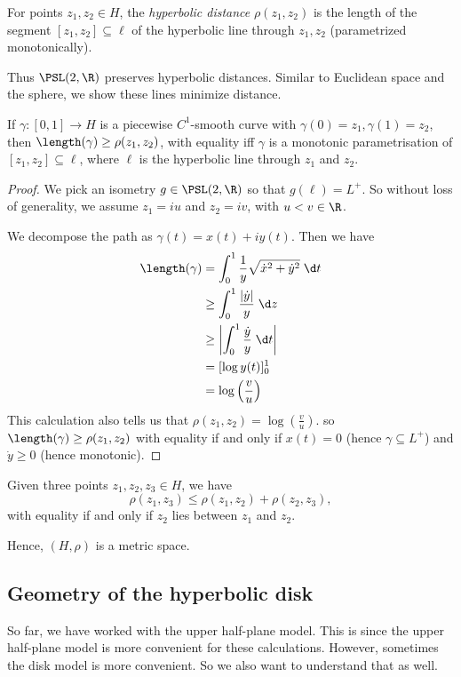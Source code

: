 \documentclass[a4paper]{article}
\begin{document}
\begin{defi}
  For points $z_1, z_2 \in H$, the \emph{hyperbolic distance} $\rho(z_1, z_2)$ is the length of the segment $[z_1, z_2] \subseteq \ell$ of the hyperbolic line through $z_1, z_2$ (parametrized monotonically).
\end{defi}
Thus $\PSL(2, \R)$ preserves hyperbolic distances. Similar to Euclidean space and the sphere, we show these lines minimize distance.

\begin{prop}
  If $\gamma: [0, 1] \to H$ is a piecewise $C^1$-smooth curve with $\gamma(0) = z_1, \gamma(1) = z_2$, then $\length(\gamma) \geq \rho(z_1, z_2)$, with equality iff $\gamma$ is a monotonic parametrisation of $[z_1, z_2] \subseteq \ell$, where $\ell$ is the hyperbolic line through $z_1$ and $z_2$.
\end{prop}

\begin{proof}
  We pick an isometry $g \in \PSL(2, \R)$ so that $g(\ell) = L^+$. So without loss of generality, we assume $z_1 = iu$ and $z_2 = iv$, with $u < v \in \R$.

  We decompose the path as $\gamma(t) = x(t) + iy(t)$. Then we have
  \begin{align*}
    \length(\gamma) &= \int_0^1 \frac{1}{y}\sqrt{\dot{x}^2 + \dot{y}^2} \;\d t \\
    &\geq \int_0^1 \frac{|\dot{y}|}{y}\;\d z\\
    &\geq \left|\int_0^1 \frac{\dot{y}}{y}\;\d t\right| \\
    &= [\log y(t)]_0^1\\
    &= \log\left(\frac{v}{u}\right)
  \end{align*}
  This calculation also tells us that $\rho(z_1, z_2) = \log\left(\frac{v}{u}\right)$. so $\length(\gamma) \geq \rho(z_1, z_2)$ with equality if and only if $x(t) = 0$ (hence $\gamma \subseteq L^+$) and $\dot{y} \geq 0$ (hence monotonic).
\end{proof}

\begin{cor}
  Given three points $z_1, z_2, z_3 \in H$, we have
  \[
    \rho(z_1, z_3) \leq \rho(z_1, z_2) + \rho(z_2, z_3),
  \]
  with equality if and only if $z_2$ lies between $z_1$ and $z_2$.
\end{cor}
Hence, $(H, \rho)$ is a metric space.

\subsection{Geometry of the hyperbolic disk}
So far, we have worked with the upper half-plane model. This is since the upper half-plane model is more convenient for these calculations. However, sometimes the disk model is more convenient. So we also want to understand that as well.
\end{document}

